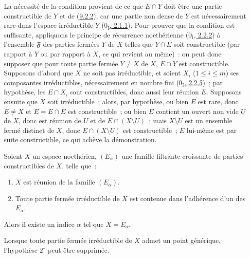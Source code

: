 La nécessité de la condition provient de ce que $E\cap Y$ doit être une
partie constructible de $Y$ et de (\hyperref[0.9.2.2-fr]{9.2.2}), car une
partie non dense de $Y$ est nécessairement rare dans l'espace irréductible
$Y$ (\hyperref[0.2.1.1-fr]{$0_{\mathrm I}$, 2.1.1}). Pour prouver que la
condition est suffisante, appliquons le principe de récurrence noethérienne
(\hyperref[0.2.2.2-fr]{$0_{\mathrm I}$, 2.2.2}) à l'ensemble
$\mathfrak{F}$ des parties fermées $Y$ de $X$ telles que $Y\cap E$ soit
constructible (par rapport à $Y$ ou par rapport à $X$, ce qui revient au
même)~: on peut donc supposer que pour toute partie fermée $Y\ne X$ de $X$,
$E\cap Y$ est constructible. Supposons d'abord que $X$ ne soit pas
irréductible, et soient $X_i$ ($1\leq i\leq m$) ses composantes
irréductibles, nécessairement en nombre fini
(\hyperref[0.2.2.5-fr]{$0_{\mathrm I}$, 2.2.5})~; par hypothèse, les
$E\cap X_i$ sont constructibles, donc aussi leur réunion $E$. Supposons
ensuite que $X$ soit irréductible~; alors, par hypothèse, ou bien $E$ est
rare, donc $\overline{E}\ne X$ et $E=E\cap\overline{E}$ est constructible~;
ou bien $E$ contient un ouvert non vide $U$ de $X$, donc est réunion de $U$
et de $E\cap(X\setminus U)$~; mais $X\setminus U$ est un ensemble fermé
distinct de $X$, donc $E\cap(X\setminus U)$ est constructible~; $E$
lui-même est par suite constructible, ce qui achève la démonstration.

\begin{corollary}[9.2.4]
\label{0.9.2.4-fr}
Soient $X$ un espace noethérien, $(E_\alpha)$ une famille filtrante
croissante de parties constructibles de $X$, telle que~:
\begin{enumerate}
  \item[$1^\circ$] $X$ est réunion de la famille $(E_\alpha)$.
  \item[$2^\circ$] Toute partie fermée irréductible de $X$ est contenue dans
    l'adhérence d'un des $E_\alpha$.
\end{enumerate}
Alors il existe un indice $\alpha$ tel que $X=E_\alpha$.

Lorsque toute partie fermée irréductible de $X$ admet un point générique,
l'hypothèse $2^\circ$ peut être supprimée.
\end{corollary}

